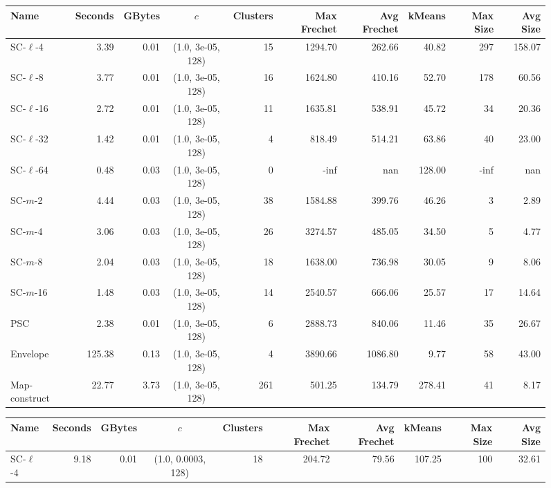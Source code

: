 \documentclass[11pt]{article}
\begin{document}
\begin{figure} \begin{center}
        \begin{minipage}{\textwidth}
    {
    \begin{tabular}{@{}lrrcrrrrrr@{}}
        \toprule
        Name & Seconds & GBytes & $c$ & Clusters & Max Frechet & Avg Frechet & kMeans & Max Size & Avg Size\\
        \midrule
        SC-$\ell$-4 & 3.39 & 0.01 & (1.0, 3e-05, 128) & 15 & 1294.70 & 262.66 & 40.82 & 297 & 158.07\\
        SC-$\ell$-8 & 3.77 & 0.01 & (1.0, 3e-05, 128) & 16 & 1624.80 & 410.16 & 52.70 & 178 & 60.56\\
        SC-$\ell$-16 & 2.72 & 0.01 & (1.0, 3e-05, 128) & 11 & 1635.81 & 538.91 & 45.72 & 34 & 20.36\\
        SC-$\ell$-32 & 1.42 & 0.01 & (1.0, 3e-05, 128) & 4 & 818.49 & 514.21 & 63.86 & 40 & 23.00\\
        SC-$\ell$-64 & 0.48 & 0.03 & (1.0, 3e-05, 128) & 0 & -inf & nan & 128.00 & -inf & nan\\
        SC-$m$-2 & 4.44 & 0.03 & (1.0, 3e-05, 128) & 38 & 1584.88 & 399.76 & 46.26 & 3 & 2.89\\
        SC-$m$-4 & 3.06 & 0.03 & (1.0, 3e-05, 128) & 26 & 3274.57 & 485.05 & 34.50 & 5 & 4.77\\
        SC-$m$-8 & 2.04 & 0.03 & (1.0, 3e-05, 128) & 18 & 1638.00 & 736.98 & 30.05 & 9 & 8.06\\
        SC-$m$-16 & 1.48 & 0.03 & (1.0, 3e-05, 128) & 14 & 2540.57 & 666.06 & 25.57 & 17 & 14.64\\
        PSC & 2.38 & 0.01 & (1.0, 3e-05, 128) & 6 & 2888.73 & 840.06 & 11.46 & 35 & 26.67\\
        Envelope & 125.38 & 0.13 & (1.0, 3e-05, 128) & 4 & 3890.66 & 1086.80 & 9.77 & 58 & 43.00\\
        Map-construct & 22.77 & 3.73 & (1.0, 3e-05, 128) & 261 & 501.25 & 134.79 & 278.41 & 41 & 8.17\\
        \bottomrule
    \end{tabular}}
    {
    \begin{tabular}{@{}lrrcrrrrrr@{}}
        \toprule
        Name & Seconds & GBytes & $c$ & Clusters & Max Frechet & Avg Frechet & kMeans & Max Size & Avg Size\\
        \midrule
        SC-$\ell$-4 & 9.18 & 0.01 & (1.0, 0.0003, 128) & 18 & 204.72 & 79.56 & 107.25 & 100 & 32.61\\

\end{tabular}}
\end{minipage}
\end{center}
\end{figure}
\end{document}
